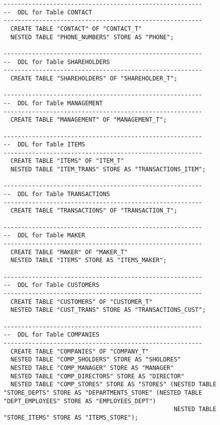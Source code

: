 \documentclass{scrartcl}
\begin{document}
\begin{lstlisting}
--------------------------------------------------------
--  DDL for Table CONTACT
--------------------------------------------------------
  CREATE TABLE "CONTACT" OF "CONTACT_T" 
  NESTED TABLE "PHONE_NUMBERS" STORE AS "PHONE";
 
--------------------------------------------------------
--  DDL for Table SHAREHOLDERS
--------------------------------------------------------
  CREATE TABLE "SHAREHOLDERS" OF "SHAREHOLDER_T"; 
  
--------------------------------------------------------
--  DDL for Table MANAGEMENT
--------------------------------------------------------
  CREATE TABLE "MANAGEMENT" OF "MANAGEMENT_T"; 
  
--------------------------------------------------------
--  DDL for Table ITEMS
--------------------------------------------------------
  CREATE TABLE "ITEMS" OF "ITEM_T"
  NESTED TABLE "ITEM_TRANS" STORE AS "TRANSACTIONS_ITEM"; 
  
--------------------------------------------------------
--  DDL for Table TRANSACTIONS
--------------------------------------------------------
  CREATE TABLE "TRANSACTIONS" OF "TRANSACTION_T"; 
  
--------------------------------------------------------
--  DDL for Table MAKER
--------------------------------------------------------
  CREATE TABLE "MAKER" OF "MAKER_T"
  NESTED TABLE "ITEMS" STORE AS "ITEMS_MAKER"; 
  
--------------------------------------------------------
--  DDL for Table CUSTOMERS
--------------------------------------------------------
  CREATE TABLE "CUSTOMERS" OF "CUSTOMER_T"
  NESTED TABLE "CUST_TRANS" STORE AS "TRANSACTIONS_CUST"; 
  
--------------------------------------------------------
--  DDL for Table COMPANIES
--------------------------------------------------------
  CREATE TABLE "COMPANIES" OF "COMPANY_T" 
  NESTED TABLE "COMP_SHOLDERS" STORE AS "SHOLDRES"
  NESTED TABLE "COMP_MANAGER" STORE AS "MANAGER" 
  NESTED TABLE "COMP_DIRECTORS" STORE AS "DIRECTOR"
  NESTED TABLE "COMP_STORES" STORE AS "STORES" (NESTED TABLE "STORE_DEPTS" STORE AS "DEPARTMENTS_STORE" (NESTED TABLE "DEPT_EMPLOYEES" STORE AS "EMPLOYEES_DEPT")
												NESTED TABLE "STORE_ITEMS" STORE AS "ITEMS_STORE");
\end{lstlisting}
		
\end{document}
